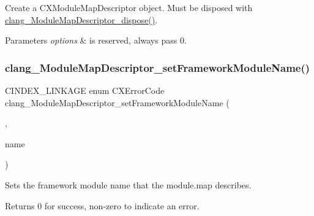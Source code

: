 Create a {\ttfamily C\+X\+Module\+Map\+Descriptor} object. Must be disposed with {\ttfamily \mbox{\hyperlink{group__BUILD__SYSTEM_gad905d6dc860716f1a35d2b87f46b81f9}{clang\+\_\+\+Module\+Map\+Descriptor\+\_\+dispose()}}}. 


\begin{DoxyParams}{Parameters}
{\em options} & is reserved, always pass 0. \\
\hline
\end{DoxyParams}
\mbox{\label{group__BUILD__SYSTEM_gaaad31887de3a3856891a846e96f59802}} 
\subsubsection{\texorpdfstring{clang\+\_\+\+Module\+Map\+Descriptor\+\_\+set\+Framework\+Module\+Name()}{clang\_ModuleMapDescriptor\_setFrameworkModuleName()}}
{\footnotesize\ttfamily C\+I\+N\+D\+E\+X\+\_\+\+L\+I\+N\+K\+A\+GE enum C\+X\+Error\+Code clang\+\_\+\+Module\+Map\+Descriptor\+\_\+set\+Framework\+Module\+Name (\begin{DoxyParamCaption}\item[{\mbox{\hyperlink{group__BUILD__SYSTEM_ga8d7eea7855a8d1118218c7661469b3db}{C\+X\+Module\+Map\+Descriptor}}}]{,  }\item[{const char $\ast$}]{name }\end{DoxyParamCaption})}



Sets the framework module name that the module.\+map describes. 

\begin{DoxyReturn}{Returns}
0 for success, non-\/zero to indicate an error. 
\end{DoxyReturn}
\mbox{\label{group__BUILD__SYSTEM_ga63b8b9689c04f6b0c292d1226652a74b}} 
